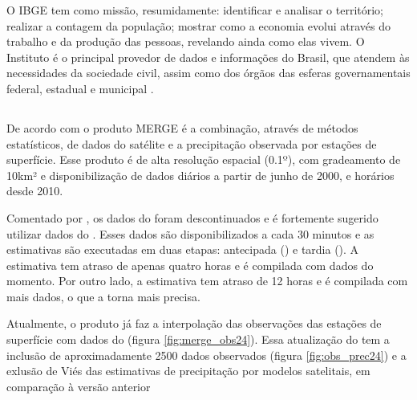 O \acrshort{IBGE} tem como missão, resumidamente: identificar e analisar o território; realizar a contagem da população; mostrar como a economia evolui através do trabalho e da produção das pessoas, revelando ainda como elas vivem.  O Instituto é o principal provedor de dados e informações do Brasil, que atendem às necessidades da sociedade civil, assim como dos órgãos das esferas governamentais federal, estadual e municipal \cite{IBGE22, IBGE23prev}. 



\subsection{}

\indent De acordo com  o produto \acrshort{MERGE} é a combinação, através de métodos estatísticos, de dados do satélite  e a precipitação observada por estações de superfície. Esse produto é de alta resolução espacial (0.1º), com gradeamento de 10km² e disponibilização de dados diários a partir de junho de 2000, e horários desde 2010.

\indent Comentado por , os dados do  foram descontinuados e é fortemente sugerido utilizar dados do . Esses dados são disponibilizados a cada 30 minutos e as estimativas são executadas em duas etapas: antecipada () e tardia (). A estimativa  tem atraso de apenas quatro horas e é compilada com dados do momento. Por outro lado, a estimativa  tem atraso de 12 horas e é compilada com mais dados, o que a torna mais precisa.

\indent Atualmente, o produto  já faz a interpolação das observações das estações de superfície com dados do  (figura \ref{fig:merge_obs24}). Essa atualização do  tem a inclusão de aproximadamente 2500 dados observados (figura \ref{fig:obs_prec24}) e a exlusão de Viés das estimativas de precipitação por modelos satelitais, em comparação à versão anterior \cite{MERGEatual}

